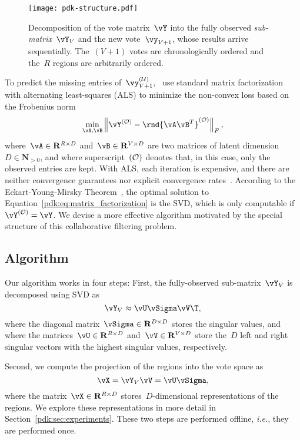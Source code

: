 \begin{figure}
	\texttt{[image: pdk-structure.pdf]}
	\caption{
		Decomposition of the vote matrix~$\vY$ into the fully observed \emph{sub-matrix}~$\vY_V$ and the new vote~$\vy_{V+1}$, whose results arrive sequentially.
		The~$(V+1)$ votes are chronologically ordered and the~$R$ regions are arbitrarily ordered.
	}
	\label{pdk:fig:structure}
\end{figure}

To predict the missing entries of~$\vy^{(\Ubs)}_{V+1}$,~\citet{etter2016online} use standard matrix factorization with alternating least-squares (ALS) to minimize the non-convex loss based on the Frobenius norm
\begin{equation}
	\label{pdk:eq:matrix_factorization}
	\min_{\vA, \vB} \left\Vert \vY^{(\Obs)} - \rnd{\vA\vB^T}^{(\Obs)} \right\Vert_F,
\end{equation}
where~$\vA \in \mathbf{R}^{R \times D}$ and~$\vB \in \mathbf{R}^{V \times D}$ are two matrices of latent dimension~$D \in \mathbf{N}_{>0}$, and where superscript~$(\mathcal{O})$ denotes that, in this case, only the observed entries are kept.
With ALS, each iteration is expensive, and there are neither convergence guarantees nor explicit convergence rates~\cite{bell2007scalable, koren2009matrix}.
According to the Eckart-Young-Mirsky Theorem~\citep{eckart1936approximation}, the optimal solution to Equation~\eqref{pdk:eq:matrix_factorization} is the SVD, which is only computable if~$\vY^{(\Obs)}=\vY$.
We devise a more effective algorithm motivated by the special structure of this collaborative filtering problem\cite{etter2016online}.

\subsection{Algorithm}

Our algorithm works in four steps:
First, the fully-observed sub-matrix~$\vY_V$ is decomposed using SVD as
\begin{equation}
	\label{pdk:eq:svd}
	\vY_V \approx \vU \vSigma \vV\T,
\end{equation}
where the diagonal matrix~$\vSigma \in \mathbf{R}^{D \times D}$ stores the singular values, and where the matrices~$\vU \in \mathbf{R}^{R \times D}$ and~$\vV \in \mathbf{R}^{V \times D}$ store the~$D$ left and right singular vectors with the highest singular values, respectively.

Second, we compute the projection of the regions into the vote space as
\begin{equation}
	\label{pdk:eq:projection}
	\vX = \vY_V \vV = \vU \vSigma,
\end{equation}
where the matrix~$\vX \in \mathbf{R}^{R \times D}$ stores~$D$-dimensional representations of the regions.
We explore these representations in more detail in Section~\ref{pdk:sec:experiments}.
These two steps are performed offline, \textit{i.e.}, they are performed once.

